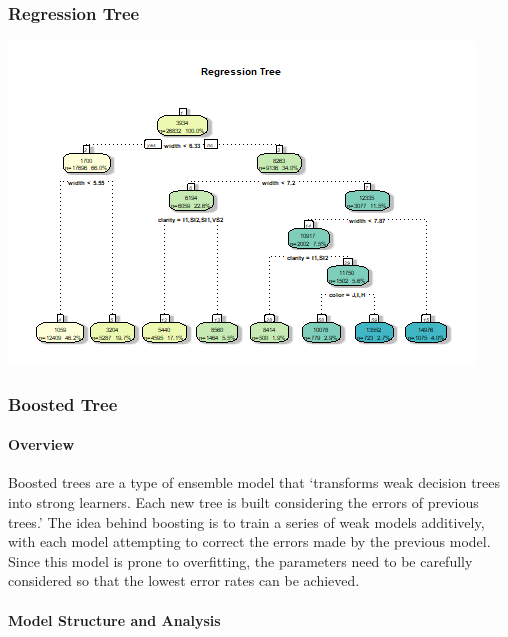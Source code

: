 \documentclass[
  paper=a4,
  ,captions=tableheading
]{scrartcl}
\begin{document}
\hypertarget{regression-tree}{%
\subsubsection{Regression Tree}\label{regression-tree}}

\begin{center}\includegraphics{Diamonds_PDF_files/figure-latex/Default Regression Tree-1} \end{center}

\hypertarget{boosted-tree}{%
\subsubsection{Boosted Tree}\label{boosted-tree}}

\hypertarget{overview-1}{%
\paragraph{Overview}\label{overview-1}}

Boosted trees are a type of ensemble model that `transforms weak
decision trees into strong learners. Each new tree is built considering
the errors of previous trees.' The idea behind boosting is to train a
series of weak models additively, with each model attempting to correct
the errors made by the previous model. Since this model is prone to
overfitting, the parameters need to be carefully considered so that the
lowest error rates can be achieved.

\hypertarget{model-structure-and-analysis-1}{%
\paragraph{Model Structure and
Analysis}\label{model-structure-and-analysis-1}}
\end{document}
